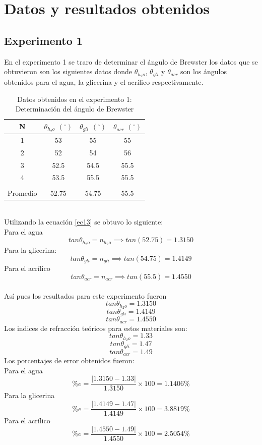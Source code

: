 \documentclass[13,twocolumn,letterpaper]{article}
\begin{document}
\section*{Datos y resultados obtenidos}
\subsection*{Experimento 1}
En el experimento 1 se traro de determinar el ángulo de Brewster
los datos que se obtuvieron son los siguientes datos donde $\theta_{h_{2}o}$, $\theta_{gli}$ y $\theta_{acr}$ son los ángulos obtenidos para el agua, la glicerina y el acrílico respectivamente. 
\begin{table}[htb]
	\centering
	\begin{tabular}{cccc}
		N & $\theta_{h_{2}o}$ $(^{\circ})$ & $\theta_{gli}$ $(^{\circ})$ & $\theta_{acr}$ $(^{\circ})$  \\ \midrule
		1  &  53 	& 55 	&	55  \\
		2  &  52 	& 54 	&	56 \\
		3  &  52.5 	& 54.5	&	55.5  \\
		4  &  53.5 	& 55.5 	&	55.5  \\ 
		&&&\\
		Promedio  & 52.75  & 54.75 & 55.5 \\\hline
	\end{tabular}
	\caption{Datos obtenidos en el experimento 1: Determinación del ángulo de Brewster} \label{tabla1}
\end{table}
\\Utilizando la ecuación \ref{ec13} se obtuvo lo siguiente:\\
Para el agua 
\begin{equation}
tan\theta_{h_{2}o}=n_{h_{2}o} \implies tan(52.75)=1.3150
\end{equation}
Para la glicerina:
\begin{equation}
tan\theta_{gli}=n_{gli} \implies tan(54.75)=1.4149
\end{equation}
Para el acrílico
\begin{equation}
tan\theta_{acr}=n_{acr} \implies tan(55.5)=1.4550
\end{equation}
\\Así pues los resultados para este experimento  fueron
$$tan\theta_{h_{2}o}=1.3150$$
$$tan\theta_{gli}=1.4149$$
$$tan\theta_{acr}=1.4550$$
Los indices de refracción teóricos para estos materiales son:
$$tan\theta_{h_{2}o}=1.33$$
$$tan\theta_{gli}=1.47$$
$$tan\theta_{acr}=1.49$$
Los porcentajes de error obtenidos fueron:\\
Para el agua
$$\%e=\dfrac{|1.3150 - 1.33|}{1.3150}\times 100=1.1406 \%$$
Para la glicerina
$$\%e=\dfrac{|1.4149 - 1.47|}{1.4149}\times 100=3.8819 \%$$
Para el acrílico
$$\%e=\dfrac{|1.4550 - 1.49|}{1.4550}\times 100=2.5054 \%$$
\end{document}
